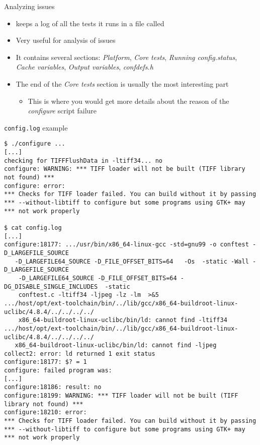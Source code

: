\begin{frame}{Analyzing issues}
  \begin{itemize}
  \item {} keeps a log of all the tests it runs in a file
    called 
  \item Very useful for analysis of  issues
  \item It contains several sections: {\em Platform}, {\em Core
      tests}, {\em Running config.status}, {\em Cache variables}, {\em
      Output variables}, {\em confdefs.h}
  \item The end of the {\em Core tests} section is usually the most
    interesting part
    \begin{itemize}
    \item This is where you would get more details about the reason of
      the {\em configure} script failure
    \end{itemize}
  \end{itemize}
\end{frame}

\begin{frame}[fragile]{{\tt config.log} example}

\begin{block}{}
{\tiny
\begin{verbatim}
$ ./configure ...
[...]
checking for TIFFFlushData in -ltiff34... no
configure: WARNING: *** TIFF loader will not be built (TIFF library not found) ***
configure: error: 
*** Checks for TIFF loader failed. You can build without it by passing
*** --without-libtiff to configure but some programs using GTK+ may
*** not work properly

$ cat config.log
[...]
configure:18177: .../usr/bin/x86_64-linux-gcc -std=gnu99 -o conftest -D_LARGEFILE_SOURCE
   -D_LARGEFILE64_SOURCE -D_FILE_OFFSET_BITS=64   -Os  -static -Wall -D_LARGEFILE_SOURCE
    -D_LARGEFILE64_SOURCE -D_FILE_OFFSET_BITS=64 -DG_DISABLE_SINGLE_INCLUDES  -static
    conftest.c -ltiff34 -ljpeg -lz -lm  >&5
.../host/opt/ext-toolchain/bin/../lib/gcc/x86_64-buildroot-linux-uclibc/4.8.4/../../../../
    x86_64-buildroot-linux-uclibc/bin/ld: cannot find -ltiff34
.../host/opt/ext-toolchain/bin/../lib/gcc/x86_64-buildroot-linux-uclibc/4.8.4/../../../../
   x86_64-buildroot-linux-uclibc/bin/ld: cannot find -ljpeg
collect2: error: ld returned 1 exit status
configure:18177: $? = 1
configure: failed program was:
[...]
configure:18186: result: no
configure:18199: WARNING: *** TIFF loader will not be built (TIFF library not found) ***
configure:18210: error: 
*** Checks for TIFF loader failed. You can build without it by passing
*** --without-libtiff to configure but some programs using GTK+ may
*** not work properly
\end{verbatim}}
\end{block}

\end{frame}


